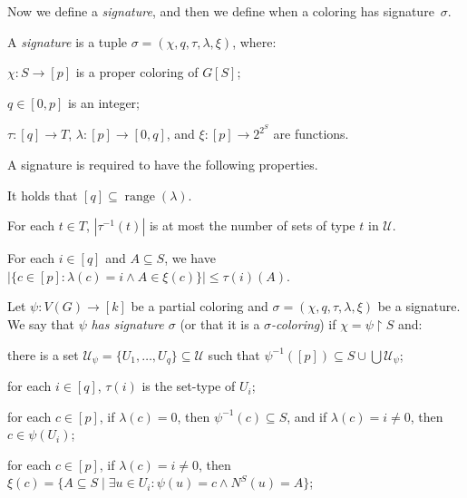 \documentclass[runningheads, envcountsame]{llncs}
\newcommand{\sep}{\;|\;}
\newcommand{\seq}{\subseteq}
\newcommand{\ca}{\mathcal}
\DeclareMathOperator{\range}{range}
\begin{document}
Now we define a \emph{signature}, and then we define when a coloring has signature~$\sigma$.

\begin{definition}\label{def:signature}
A \emph{signature} is a tuple $\sigma = (\chi, q, \tau, \lambda, \xi)$, where:
\begin{compactitem}
\item $\chi\colon S \rightarrow [p]$ is a proper coloring of $G[S]$;
\item $q \in [0, p]$ is an integer;
\item $\tau \colon [q] \rightarrow T$, $\lambda\colon [p] \rightarrow [0, q]$, and $\xi\colon [p] \rightarrow 2^{2^S}$ are functions.
\end{compactitem}
A signature is required to have the following properties.
\begin{compactenum}
\item It holds that $[q]\seq \range(\lambda)$.\label{sign:surjective}
\item For each $t \in T$, $|\tau^{-1}(t)|$ is at most the number of sets of type $t$ in $\ca U$.\label{sign:set-types}
\item For each $i \in [q]$ and $A \seq S$, we have $|\{c \in [p]\colon \lambda(c) = i \land A \in \xi(c)\}| \le \tau(i)(A)$.\label{sign:vertex-types}
\end{compactenum}
\end{definition}

\begin{definition}\label{def:represent}
Let $\psi\colon V(G) \rightarrow [k]$ be a partial coloring and $\sigma = (\chi, q, \tau, \lambda, \xi)$ be a signature.
We say that $\psi$ \emph{has signature $\sigma$} (or that it is a \emph{$\sigma$-coloring})
if $\chi = \psi \upharpoonright S$ and:
\begin{compactenum}
\item there is a set $\ca U_\psi = \{U_1, \ldots, U_q\} \seq \ca U$ such that $\psi^{-1}([p]) \seq S\cup\bigcup \ca U_\psi$;\label{repr:blocks}
\item for each $i \in [q]$, $\tau(i)$ is the set-type of $U_i$;\label{repr:types}
\item for each $c \in [p]$, if $\lambda(c) = 0$, then $\psi^{-1}(c) \seq S$, and if $\lambda(c) = i \ne 0$, then $c \in \psi(U_i)$;\label{repr:f0}
\item for each $c \in [p]$, if $\lambda(c) = i \ne 0$, then $\xi(c) = \{A\seq S\sep\exists u\in U_i\colon  \psi(u) = c\land N^S(u) = A\}$;\label{repr:f1}
\end{compactenum}
\end{definition}
\end{document}
